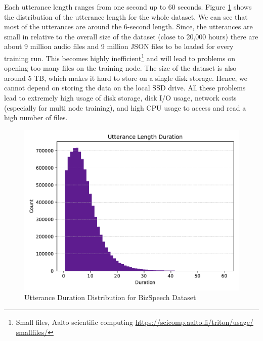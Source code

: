 Each utterance length ranges from one second up to 60 seconds. Figure \ref{fig:utt_dist} shows the distribution of the utterance length for the whole dataset. We can see that most of the utterances are around the 6-second length. Since, the utterances are small in relative to the overall size of the dataset (close to 20,000 hours) there are about 9 million audio files and 9 million JSON files to be loaded for every training run. This becomes highly inefficient\footnote{Small files, Aalto scientific computing \href{https://scicomp.aalto.fi/triton/usage/smallfiles/}{https://scicomp.aalto.fi/triton/usage/ smallfiles/}} and will lead to problems on opening too many files on the training node. The size of the dataset is also around 5 TB, which makes it hard to store on a single disk storage. Hence, we cannot depend on storing the data on the local SSD drive. All these problems lead to extremely high usage of disk storage, disk I/O usage, network costs (especially for multi node training), and high CPU usage to access and read a high number of files. 


\begin{figure}[ht]
  \begin{center}
    \includegraphics[width=\textwidth]{images/duration_distribution.pdf} 
    \caption{Utterance Duration Distribution for BizSpeech Dataset}
    \label{fig:utt_dist}
  \end{center}
\end{figure}

